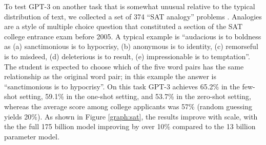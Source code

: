 To test GPT-3 on another task that is somewhat unusual relative to the typical distribution of text, we collected a set of 374 ``SAT analogy'' problems \cite{DBLP:journals/corr/cs-CL-0309035}.  Analogies are a style of multiple choice question that constituted a section of the SAT college entrance exam before 2005.  A typical example is ``audacious is to boldness as (a) sanctimonious is to hypocrisy, (b) anonymous is to identity, (c) remorseful is to misdeed, (d) deleterious is to result, (e) impressionable is to temptation''.  The student is expected to choose which of the five word pairs has the same relationship as the original word pair; in this example the answer is ``sanctimonious is to hypocrisy''.  On this task GPT-3 achieves 65.2\% in the few-shot setting, 59.1\% in the one-shot setting, and 53.7\% in the zero-shot setting, whereas the average score among college applicants was 57\% \cite{DBLP:journals/corr/abs-cs-0508103}  (random guessing yields 20\%).  As shown in Figure \ref{graph:sat}, the results improve with scale, with the the full 175 billion model improving by over 10\% compared to the 13 billion parameter model.

